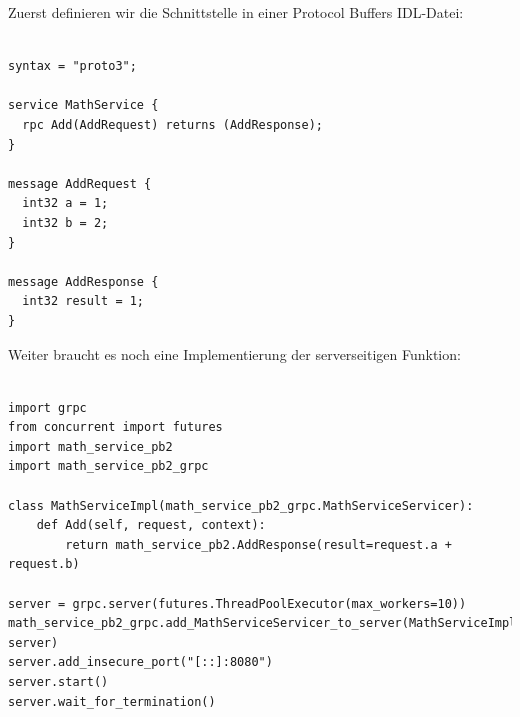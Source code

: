 \documentclass[../vs-script-first-v01.tex]{subfiles}
\begin{document}
Zuerst definieren wir die Schnittstelle in einer Protocol Buffers IDL-Datei: \\\\

\noindent\begin{minipage}{\textwidth}
\begin{lstlisting}[caption={gRPC IDL},captionpos=b,label={lst:grpc-idl}]
syntax = "proto3";

service MathService {
  rpc Add(AddRequest) returns (AddResponse);
}

message AddRequest {
  int32 a = 1;
  int32 b = 2;
}

message AddResponse {
  int32 result = 1;
}
\end{lstlisting}
\end{minipage}

Weiter braucht es noch eine Implementierung der serverseitigen Funktion:\\\\

\noindent\begin{minipage}{\textwidth}
\begin{lstlisting}[caption={gRPC Server Python},captionpos=b,label={lst:grpc-server}]
import grpc
from concurrent import futures
import math_service_pb2
import math_service_pb2_grpc

class MathServiceImpl(math_service_pb2_grpc.MathServiceServicer):
    def Add(self, request, context):
        return math_service_pb2.AddResponse(result=request.a + request.b)

server = grpc.server(futures.ThreadPoolExecutor(max_workers=10))
math_service_pb2_grpc.add_MathServiceServicer_to_server(MathServiceImpl(), server)
server.add_insecure_port("[::]:8080")
server.start()
server.wait_for_termination()
\end{lstlisting}
\end{minipage}
\end{document}
